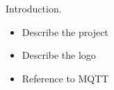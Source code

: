 Introduction.

\begin{itemize}
\item Describe the project
\item Describe the logo
\item Reference to MQTT
\end{itemize}
